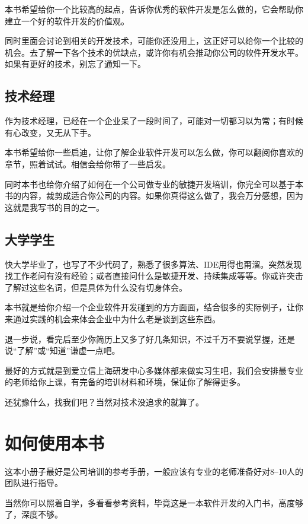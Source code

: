 本书希望给你一个比较高的起点，告诉你优秀的软件开发是怎么做的，它会帮助你建立一个好的软件开发的价值观。

同时里面会讨论到相关的开发技术，可能你还没用上，这正好可以给你一个比较的机会。去了解一下各个技术的优缺点，或许你有机会推动你公司的软件开发水平。如果有更好的技术，别忘了通知一下。

\subsection{技术经理}
\label{技术经理}

作为技术经理，已经在一个企业呆了一段时间了，可能对一切都习以为常；有时候有心改变，又无从下手。

本书希望给你一些启迪，让你了解企业软件开发可以怎么做，你可以翻阅你喜欢的章节，照着试试。相信会给你带了一些启发。

同时本书也给你介绍了如何在一个公司做专业的敏捷开发培训，你完全可以基于本书的内容，裁剪成适合你公司的内容。如果你真得这么做了，我会万分感想，因为这就是我写书的目的之一。

\subsection{大学学生}
\label{大学学生}

快大学毕业了，也写了不少代码了，熟悉了很多算法、IDE用得也甭溜。突然发现找工作老问有没有经验；或者直接问什么是敏捷开发、持续集成等等。你或许突击了解过这些名词，但是具体为什么没有切身体会。

本书就是给你介绍一个企业软件开发碰到的方方面面，结合很多的实际例子，让你来通过实践的机会来体会企业中为什么老是谈到这些东西。

退一步说，看完后至少你简历上又多了好几条知识，不过千万不要说掌握，还是说“了解”或“知道”谦虚一点吧。

最好的方式就是到爱立信上海研发中心多媒体部来做实习生吧，我们会安排最专业的老师给你上课，有完备的培训材料和环境，保证你了解得更多。

还犹豫什么，找我们吧？当然对技术没追求的就算了。

\section{如何使用本书}
\label{如何使用本书}

这本小册子最好是公司培训的参考手册，一般应该有专业的老师准备好对8--10人的团队进行指导。

当然你可以照着自学，多看看参考资料，毕竟这是一本软件开发的入门书，高度够了，深度不够。

